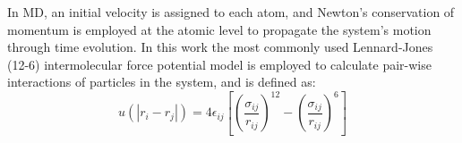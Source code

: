 \documentclass[preprint,12pt]{elsarticle}
\newcommand{\Nkimnote}[1]{ {\textcolor{blue} { ***NKim: #1 }}}
\newcommand{\Nkimnote}[1]{}
\begin{document}
In MD, an initial velocity is assigned to each atom, and Newton's conservation of momentum is employed at the atomic level to propagate the system's motion through time evolution. In this work the most commonly used Lennard-Jones (12-6) intermolecular force potential model is employed to calculate pair-wise interactions of particles in the system, and is defined as: 
\vspace{-.2em}
\begin{equation}
 u(|r_{i} - r_{j}|) = 4\epsilon_{ij}[(\frac{\sigma_{ij}}{r_{ij}})^{12}-(\frac{\sigma_{ij}}{r_{ij}})^{6}]
 \label{eq:LJ12}
\end{equation}
\normalsize



\end{document}
